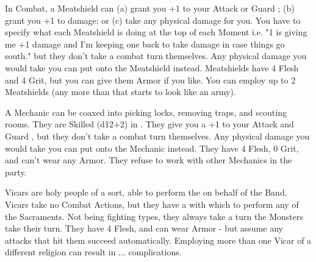 
    In Combat, a Meatshield can (a) grant you +1 to your Attack or Guard \RO; (b) grant you +1 to damage; or (c) take any physical damage for you.  You have to specify what each Meatshield is doing at the top of each Moment i.e. "1 is giving me +1 damage and I'm keeping one back to take damage in case things go south." but they don't take a combat turn themselves.  Any physical damage you would take you can put onto the Meatshield instead.  Meatshields have 4 Flesh and 4 Grit, but you can give them Armor if you like. You can employ up to 2 Meatshields (any more than that starts to look like an army).


    A Mechanic can be coaxed into picking locks, removing traps, and scouting rooms.  They are Skilled (d12+2) in .  They give you a +1 to your Attack and Guard \RO, but they don't take a combat turn themselves.  Any physical damage you would take you can put onto the Mechanic instead.  They have 4 Flesh, 0 Grit, and can't wear any Armor. They refuse to work with other Mechanics in the party.


    Vicars are holy people of a sort, able to perform the  on behalf of the Band. Vicars take no Combat Actions, but they have a  with which to perform any of the Sacraments. Not being fighting types, they always take a turn  the Monsters take their turn. They have 4 Flesh, and can wear Armor - but assume any attacks that hit them succeed automatically. Employing more than one Vicar of a different religion can result in ... complications.

